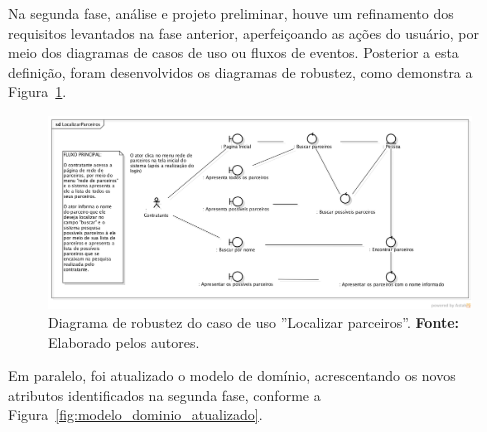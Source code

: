%	


\par Na segunda fase, análise e projeto preliminar, houve um refinamento dos requisitos levantados na fase anterior, aperfeiçoando as ações do usuário, por meio dos diagramas de casos de uso ou fluxos de eventos. Posterior a esta definição, foram desenvolvidos os diagramas de robustez, como demonstra a Figura~\ref{fig:diagrama_robustez_localizar_mao_de_obra}.

\newpage
\begin{figure}[h!]
	\centerline{\includegraphics[scale=0.35]{./imagens/apendices/diagrama-robustez-localizar-parceiros.png}}
	\caption[Diagrama de robustez do caso de uso ''Localizar parceiros'']
	{Diagrama de robustez do caso de uso ''Localizar parceiros''. \textbf{Fonte:} Elaborado pelos autores.}
	\label{fig:diagrama_robustez_localizar_mao_de_obra}
\end{figure}

Em paralelo, foi atualizado o modelo de domínio, acrescentando os novos atributos identificados na segunda fase, conforme a Figura~\ref{fig:modelo_dominio_atualizado}.

